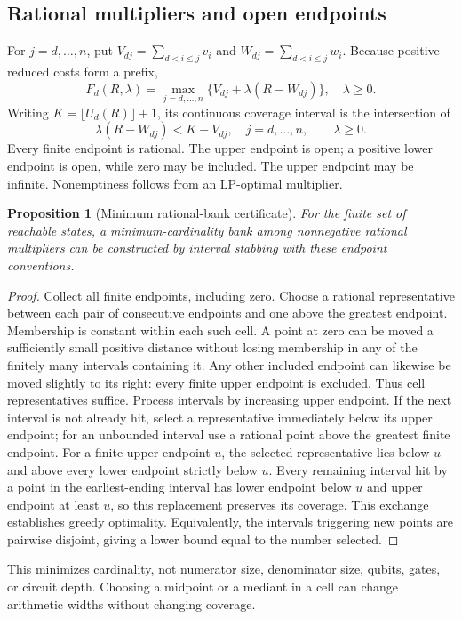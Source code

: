\documentclass[referee,pdflatex,sn-mathphys-num]{sn-jnl}
\theoremstyle{thmstyleone}
\newtheorem{proposition}[theorem]{Proposition}
\theoremstyle{thmstyletwo}
\begin{document}
\subsection{Rational multipliers and open endpoints}
For $j=d,\ldots,n$, put $V_{dj}=\sum_{d<i\leq j}v_i$ and $W_{dj}=\sum_{d<i\leq j}w_i$. Because positive reduced costs form a prefix,
\begin{equation}\label{eq:affine}
 F_d(R,\lambda)=\max_{j=d,\ldots,n}\{V_{dj}+\lambda(R-W_{dj})\},\quad \lambda\geq0.
\end{equation}
Writing $K=\lfloor U_d(R)\rfloor+1$, its continuous coverage interval is the intersection of
\begin{equation}\label{eq:interval}
 \lambda(R-W_{dj})<K-V_{dj},\quad j=d,\ldots,n,\qquad \lambda\geq0.
\end{equation}
Every finite endpoint is rational. The upper endpoint is open; a positive lower endpoint is open, while zero may be included. The upper endpoint may be infinite. Nonemptiness follows from an LP-optimal multiplier.

\begin{proposition}[Minimum rational-bank certificate]\label{prop:continuous}
For the finite set of reachable states, a minimum-cardinality bank among nonnegative rational multipliers can be constructed by interval stabbing with these endpoint conventions.
\end{proposition}
\begin{proof}
Collect all finite endpoints, including zero. Choose a rational representative between each pair of consecutive endpoints and one above the greatest endpoint. Membership is constant within each such cell. A point at zero can be moved a sufficiently small positive distance without losing membership in any of the finitely many intervals containing it. Any other included endpoint can likewise be moved slightly to its right: every finite upper endpoint is excluded. Thus cell representatives suffice. Process intervals by increasing upper endpoint. If the next interval is not already hit, select a representative immediately below its upper endpoint; for an unbounded interval use a rational point above the greatest finite endpoint. For a finite upper endpoint $u$, the selected representative lies below $u$ and above every lower endpoint strictly below $u$. Every remaining interval hit by a point in the earliest-ending interval has lower endpoint below $u$ and upper endpoint at least $u$, so this replacement preserves its coverage. This exchange establishes greedy optimality. Equivalently, the intervals triggering new points are pairwise disjoint, giving a lower bound equal to the number selected.
\end{proof}
This minimizes cardinality, not numerator size, denominator size, qubits, gates, or circuit depth. Choosing a midpoint or a mediant in a cell can change arithmetic widths without changing coverage.
\end{document}
